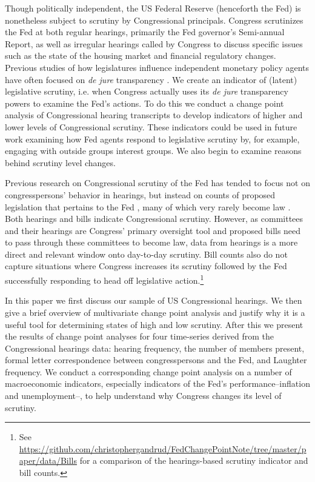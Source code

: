 \documentclass[a4paper]{article}\usepackage[]{graphicx}\usepackage[]{color}
\begin{document}
Though politically independent, the US Federal Reserve (henceforth the Fed) is nonetheless subject to scrutiny by Congressional principals. Congress scrutinizes the Fed at both regular hearings, primarily the Fed governor's Semi-annual Report, as well as irregular hearings called by Congress to discuss specific issues such as the state of the housing market and financial regulatory changes. Previous studies of how legislatures influence independent monetary policy agents have often focused on \emph{de jure} transparency \citep[for example][]{Stasavage2003}. We create an indicator of (latent) legislative scrutiny, i.e. when Congress actually uses its \emph{de jure} transparency powers to examine the Fed's actions. To do this we conduct a change point analysis \citep{SenSrivastava1975, Killick2013, Matteson2014} of Congressional hearing transcripts to develop indicators of higher and lower levels of Congressional scrutiny. These indicators could be used in future work examining how Fed agents respond to legislative scrutiny by, for example, engaging with outside groups interest groups. We also begin to examine reasons behind scrutiny level changes.

Previous research on Congressional scrutiny of the Fed has tended to focus not on congresspersons' behavior in hearings, but instead on counts of proposed legislation that pertains to the Fed \citep[e.g.][]{Kettl1988}, many of which very rarely become law \citep{Binder2014}. Both hearings and bills indicate Congressional scrutiny. However, as committees and their hearings are Congress' primary oversight tool \citep[][382]{oleszek2013} and proposed bills need to pass through these committees to become law, data from hearings is a more direct and relevant window onto day-to-day scrutiny. Bill counts also do not capture situations where Congress increases its scrutiny followed by the Fed successfully responding to head off legislative action.\footnote{See \url{https://github.com/christophergandrud/FedChangePointNote/tree/master/paper/data/Bills} for a comparison of the hearings-based scrutiny indicator and bill counts.}

In this paper we first discuss our sample of US Congressional hearings. We then give a brief overview of multivariate change point analysis and justify why it is a useful tool for determining states of high and low scrutiny. After this we present the results of change point analyses for four time-series derived from the Congressional hearings data: hearing frequency, the number of members present, formal letter correspondence between congresspersons and the Fed, and Laughter frequency. We conduct a corresponding change point analysis on a number of macroeconomic indicators, especially indicators of the Fed's performance--inflation and unemployment--, to help understand why Congress changes its level of scrutiny.
\end{document}
